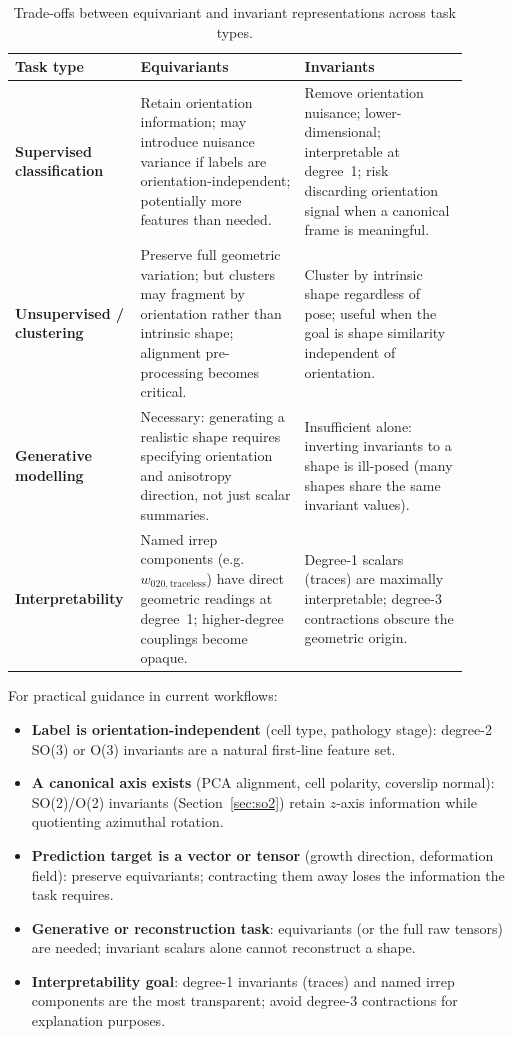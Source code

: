 \documentclass[11pt,a4paper]{article}
\begin{document}
\begin{table}[h]
\centering
\caption{Trade-offs between equivariant and invariant representations across task types.}
\label{tab:tradeoffs}
\begin{tabularx}{\linewidth}{p{0.20\linewidth}p{0.35\linewidth}p{0.35\linewidth}}
\toprule
Task type & Equivariants & Invariants \\
\midrule
\textbf{Supervised classification} &
  Retain orientation information; may introduce nuisance variance if labels are
  orientation-independent; potentially more features than needed. &
  Remove orientation nuisance; lower-dimensional; interpretable at degree~1;
  risk discarding orientation signal when a canonical frame is meaningful. \\
\addlinespace
\textbf{Unsupervised / clustering} &
  Preserve full geometric variation; but clusters may fragment by orientation
  rather than intrinsic shape; alignment pre-processing becomes critical. &
  Cluster by intrinsic shape regardless of pose; useful when the goal is shape
  similarity independent of orientation. \\
\addlinespace
\textbf{Generative modelling} &
  Necessary: generating a realistic shape requires specifying orientation and
  anisotropy direction, not just scalar summaries. &
  Insufficient alone: inverting invariants to a shape is ill-posed
  (many shapes share the same invariant values). \\
\addlinespace
\textbf{Interpretability} &
  Named irrep components (e.g.\ $w_{020,\text{traceless}}$) have direct geometric
  readings at degree~1; higher-degree couplings become opaque. &
  Degree-1 scalars (traces) are maximally interpretable; degree-3 contractions
  obscure the geometric origin. \\
\bottomrule
\end{tabularx}
\end{table}

\noindent
For practical guidance in current workflows:
\begin{itemize}
  \item \textbf{Label is orientation-independent} (cell type, pathology stage):
        degree-2 SO(3) or O(3) invariants are a natural first-line feature set.
  \item \textbf{A canonical axis exists} (PCA alignment, cell polarity, coverslip
        normal): SO(2)/O(2) invariants (Section~\ref{sec:so2}) retain $z$-axis
        information while quotienting azimuthal rotation.
  \item \textbf{Prediction target is a vector or tensor} (growth direction,
        deformation field): preserve equivariants; contracting them away loses the
        information the task requires.
  \item \textbf{Generative or reconstruction task}: equivariants (or the full raw
        tensors) are needed; invariant scalars alone cannot reconstruct a shape.
  \item \textbf{Interpretability goal}: degree-1 invariants (traces) and named
        irrep components are the most transparent; avoid degree-3 contractions for
        explanation purposes.
\end{itemize}
\end{document}
